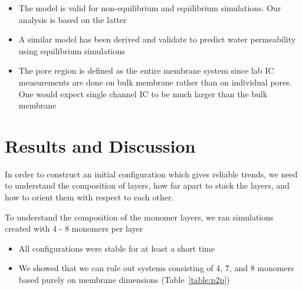 \documentclass{article}
\begin{document}
\begin{itemize}
\begin{itemize}
                        \item The model is valid for non-equilibrium and equilibrium simulations. Our analysis is based on the latter
                        \item A similar model has been derived and validate to predict water permeability using equilibrium simulations
                        \item The pore region is defined as the entire membrane system since lab IC measurements are done on bulk membrane rather than on individual pores. One would expect single channel IC to be much larger than the bulk membrane %
                \end{itemize}
        \end{itemize}

	\section{Results and Discussion}

	In order to construct an initial configuration which gives reliable trends, we need to understand the composition of layers, how far apart to stack the layers, and how to orient them with respect to each other.
		
	To understand the composition of the monomer layers, we ran simulations created with 4 - 8 monomers per layer 
	\begin{itemize}
		\item All configurations were stable for at least a short time %
                \item We showed that we can rule out systems consisting of 4, 7, and 8 monomers based purely on membrane dimensions (Table~\ref{table:p2p})
        \end{itemize}
        
\end{document}
